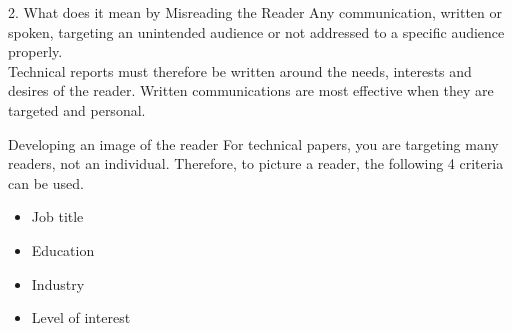 \documentclass[10pt]{beamer}
\begin{document}
{
	\begin{frame}{2. What does it mean by Misreading the Reader}
		Any communication, written or spoken, targeting an unintended audience or not addressed to a specific audience properly. \\
		\vspace{5mm}
		Technical reports must therefore be written around the needs, interests and desires of the reader. Written communications are most effective when they are targeted and personal.
	\end{frame}
}
{
	\begin{frame}{Developing an image of the reader}
		For technical papers, you are targeting many readers, not an individual. Therefore, to picture a reader, the following 4 criteria can be used. 
		\begin{itemize}
			\item Job title
			\item Education
			\item Industry
			\item Level of interest
		\end{itemize}
	\end{frame}
}
\end{document}
